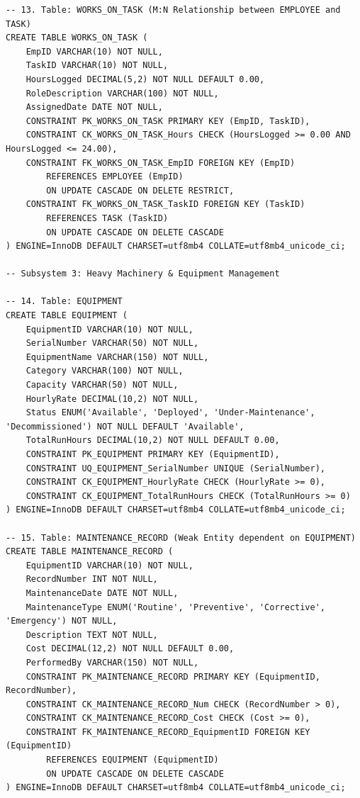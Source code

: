 \documentclass[a4paper,12pt]{report}
\begin{document}
\begin{lstlisting}
-- 13. Table: WORKS_ON_TASK (M:N Relationship between EMPLOYEE and TASK)
CREATE TABLE WORKS_ON_TASK (
    EmpID VARCHAR(10) NOT NULL,
    TaskID VARCHAR(10) NOT NULL,
    HoursLogged DECIMAL(5,2) NOT NULL DEFAULT 0.00,
    RoleDescription VARCHAR(100) NOT NULL,
    AssignedDate DATE NOT NULL,
    CONSTRAINT PK_WORKS_ON_TASK PRIMARY KEY (EmpID, TaskID),
    CONSTRAINT CK_WORKS_ON_TASK_Hours CHECK (HoursLogged >= 0.00 AND HoursLogged <= 24.00),
    CONSTRAINT FK_WORKS_ON_TASK_EmpID FOREIGN KEY (EmpID)
        REFERENCES EMPLOYEE (EmpID)
        ON UPDATE CASCADE ON DELETE RESTRICT,
    CONSTRAINT FK_WORKS_ON_TASK_TaskID FOREIGN KEY (TaskID)
        REFERENCES TASK (TaskID)
        ON UPDATE CASCADE ON DELETE CASCADE
) ENGINE=InnoDB DEFAULT CHARSET=utf8mb4 COLLATE=utf8mb4_unicode_ci;

-- Subsystem 3: Heavy Machinery & Equipment Management

-- 14. Table: EQUIPMENT
CREATE TABLE EQUIPMENT (
    EquipmentID VARCHAR(10) NOT NULL,
    SerialNumber VARCHAR(50) NOT NULL,
    EquipmentName VARCHAR(150) NOT NULL,
    Category VARCHAR(100) NOT NULL,
    Capacity VARCHAR(50) NOT NULL,
    HourlyRate DECIMAL(10,2) NOT NULL,
    Status ENUM('Available', 'Deployed', 'Under-Maintenance', 'Decommissioned') NOT NULL DEFAULT 'Available',
    TotalRunHours DECIMAL(10,2) NOT NULL DEFAULT 0.00,
    CONSTRAINT PK_EQUIPMENT PRIMARY KEY (EquipmentID),
    CONSTRAINT UQ_EQUIPMENT_SerialNumber UNIQUE (SerialNumber),
    CONSTRAINT CK_EQUIPMENT_HourlyRate CHECK (HourlyRate >= 0),
    CONSTRAINT CK_EQUIPMENT_TotalRunHours CHECK (TotalRunHours >= 0)
) ENGINE=InnoDB DEFAULT CHARSET=utf8mb4 COLLATE=utf8mb4_unicode_ci;

-- 15. Table: MAINTENANCE_RECORD (Weak Entity dependent on EQUIPMENT)
CREATE TABLE MAINTENANCE_RECORD (
    EquipmentID VARCHAR(10) NOT NULL,
    RecordNumber INT NOT NULL,
    MaintenanceDate DATE NOT NULL,
    MaintenanceType ENUM('Routine', 'Preventive', 'Corrective', 'Emergency') NOT NULL,
    Description TEXT NOT NULL,
    Cost DECIMAL(12,2) NOT NULL DEFAULT 0.00,
    PerformedBy VARCHAR(150) NOT NULL,
    CONSTRAINT PK_MAINTENANCE_RECORD PRIMARY KEY (EquipmentID, RecordNumber),
    CONSTRAINT CK_MAINTENANCE_RECORD_Num CHECK (RecordNumber > 0),
    CONSTRAINT CK_MAINTENANCE_RECORD_Cost CHECK (Cost >= 0),
    CONSTRAINT FK_MAINTENANCE_RECORD_EquipmentID FOREIGN KEY (EquipmentID)
        REFERENCES EQUIPMENT (EquipmentID)
        ON UPDATE CASCADE ON DELETE CASCADE
) ENGINE=InnoDB DEFAULT CHARSET=utf8mb4 COLLATE=utf8mb4_unicode_ci;


\end{lstlisting}
\end{document}
